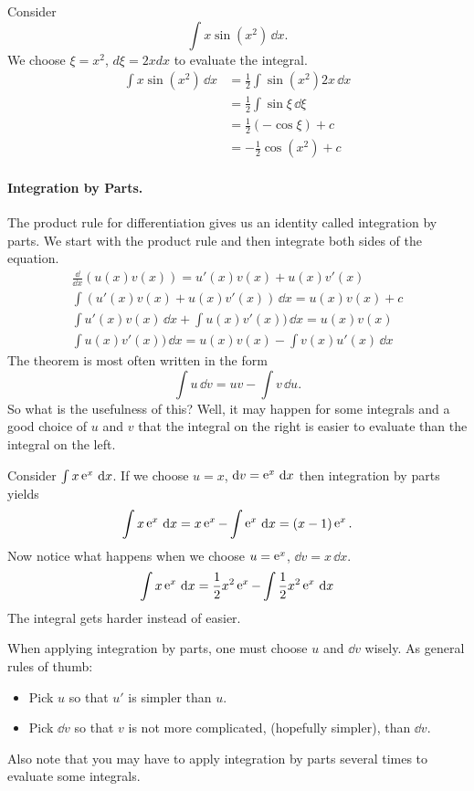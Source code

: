 \begin{Example}
  Consider
  \[
  \int x \sin(x^2) \,\dd x.
  \]
  We choose $\xi = x^2$, $d\xi = 2 x d x$ to evaluate the integral.
  \begin{align*}
    \int x \sin(x^2) \,\dd x
    &= \frac{1}{2} \int \sin(x^2) 2 x \,\dd x \\
    &= \frac{1}{2} \int \sin \xi \,\dd \xi \\
    &= \frac{1}{2} (-\cos \xi) + c \\
    &= - \frac{1}{2} \cos( x^2 ) + c
  \end{align*}
\end{Example}




\paragraph{Integration by Parts.}
The product rule for differentiation gives us an identity called integration
by parts.  We start with the product rule and then integrate both sides
of the equation.
\begin{gather*}
  \frac{\dd}{\dd x} (u(x) v(x)) = u'(x) v(x) + u(x) v'(x) \\
  \int ( u'(x) v(x) + u(x) v'(x) ) \,\dd x = u(x) v(x) + c \\
  \int u'(x) v(x) \,\dd x + \int u(x) v'(x) ) \,\dd x = u(x) v(x) \\
  \int u(x) v'(x) ) \,\dd x = u(x) v(x)  - \int v(x) u'(x) \,\dd x
\end{gather*}
The theorem is most often written in the form
\[
\int u \,\dd v = u v - \int v \,\dd u.
\]
So what is the usefulness of this?  Well, it may happen for some integrals
and a good choice of $u$ and $v$ that the integral on the right is easier
to evaluate than the integral on the left.



\begin{Example}
  Consider $\int x \mathop{\mathrm{e}}\nolimits^x \,\mathrm{d} x$.  If we choose $u = x$, $\mathrm{d} v = \mathop{\mathrm{e}}\nolimits^x \,\mathrm{d} x$ then
  integration by parts yields
  \[
  \int x \mathop{\mathrm{e}}\nolimits^x \,\mathrm{d} x = x \mathop{\mathrm{e}}\nolimits^x - \int \mathop{\mathrm{e}}\nolimits^x \,\mathrm{d} x = (x-1) \mathop{\mathrm{e}}\nolimits^x.
  \]
  Now notice what happens when we choose $u = \mathop{\mathrm{e}}\nolimits^x$, $\dd v = x \,\dd x$.
  \[
  \int x \mathop{\mathrm{e}}\nolimits^x \,\mathrm{d} x = \frac{1}{2} x^2 \mathop{\mathrm{e}}\nolimits^x - \int \frac{1}{2} x^2 \mathop{\mathrm{e}}\nolimits^x \,\mathrm{d} x
  \]
  The integral gets harder instead of easier.
\end{Example}


When applying integration by parts, one must choose $u$ and $\dd v$
wisely.  As general rules of thumb:
\begin{itemize}
\item
  Pick $u$ so that $u'$ is simpler than $u$.
\item
  Pick $\dd v$ so that $v$ is not more complicated, (hopefully simpler), 
  than $\dd v$.
\end{itemize}
Also note that you may have to apply integration by parts several times
to evaluate some integrals.






